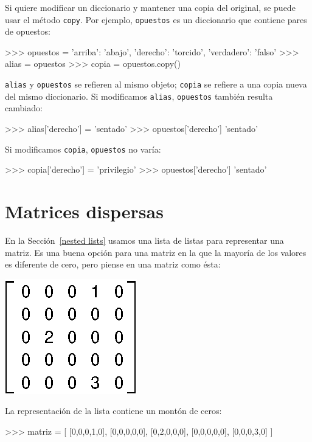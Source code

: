 Si quiere modificar un diccionario y mantener una copia del original,
se puede usar el método \texttt{copy}. Por ejemplo, \texttt{opuestos}
es un diccionario que contiene pares de opuestos:
\begin{pyconcode}
>>> opuestos = {'arriba': 'abajo', 'derecho': 'torcido', 
  'verdadero': 'falso'}
>>> alias = opuestos
>>> copia = opuestos.copy()
\end{pyconcode}

\texttt{alias} y \texttt{opuestos} se refieren al mismo objeto; \texttt{copia}
se refiere a una copia nueva del mismo diccionario. Si modificamos
\texttt{alias}, \texttt{opuestos} también resulta cambiado:
\begin{pyconcode}
>>> alias['derecho'] = 'sentado'
>>> opuestos['derecho']
'sentado'
\end{pyconcode}

Si modificamos \texttt{copia}, \texttt{opuestos} no varía:
\begin{pyconcode}
>>> copia['derecho'] = 'privilegio'
>>> opuestos['derecho']
'sentado'
\end{pyconcode}

\section{Matrices dispersas}

  

En la Sección~\ref{nested lists} usamos una lista de listas para
representar una matriz. Es una buena opción para una matriz en la
que la mayoría de los valores es diferente de cero, pero piense en
una matriz como ésta:

\beforefig\centerline{\includegraphics{illustrations/sparse}}

La representación de la lista contiene un montón de ceros:
\begin{pyconcode}
>>> matriz = [ [0,0,0,1,0],
           [0,0,0,0,0],
           [0,2,0,0,0],
           [0,0,0,0,0],
           [0,0,0,3,0] ]
\end{pyconcode}

